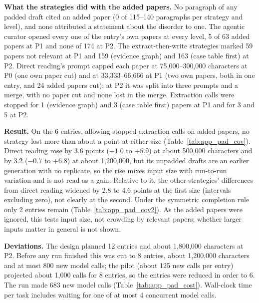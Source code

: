 \documentclass{article} %
\begin{document}
\textbf{What the strategies did with the added papers.} No paragraph of any padded draft cited an added paper (0 of 115--140 paragraphs per strategy and level), and none attributed a statement about the disorder to one. The agentic curator opened every one of the entry's own papers at every level, 5 of 63 added papers at P1 and none of 174 at P2. The extract-then-write strategies marked 59 papers not relevant at P1 and 159 (evidence graph) and 163 (case table first) at P2. Direct reading's prompt capped each paper at 75,000--300,000 characters at P0 (one own paper cut) and at 33,333--66,666 at P1 (two own papers, both in one entry, and 24 added papers cut); at P2 it was split into three prompts and a merge, with no paper cut and none lost in the merge. Extraction calls were stopped for 1 (evidence graph) and 3 (case table first) papers at P1 and for 3 and 5 at P2.

\textbf{Result.} On the 6 entries, allowing stopped extraction calls on added papers, no strategy lost more than about a point at either size (Table~\ref{tab:app_pad_cov}). Direct reading rose by 3.6 points ($+1.0$ to $+5.9$) at about 500,000 characters and by 3.2 ($-0.7$ to $+6.8$) at about 1,200,000, but its unpadded drafts are an earlier generation with no replicate, so the rise mixes input size with run-to-run variation and is not read as a gain. Relative to it, the other strategies' differences from direct reading widened by 2.8 to 4.6 points at the first size (intervals excluding zero), not clearly at the second. Under the symmetric completion rule only 2 entries remain (Table~\ref{tab:app_pad_cov2}). As the added papers were ignored, this tests input size, not crowding by relevant papers; whether larger inputs matter in general is not shown.

\textbf{Deviations.} The design planned 12 entries and about 1,800,000 characters at P2. Before any run finished this was cut to 8 entries, about 1,200,000 characters and at most 800 new model calls; the pilot (about 125 new calls per entry) projected about 1,000 calls for 8 entries, so the entries were reduced in order to 6. The run made 683 new model calls (Table~\ref{tab:app_pad_cost}). Wall-clock time per task includes waiting for one of at most 4 concurrent model calls.
\end{document}
